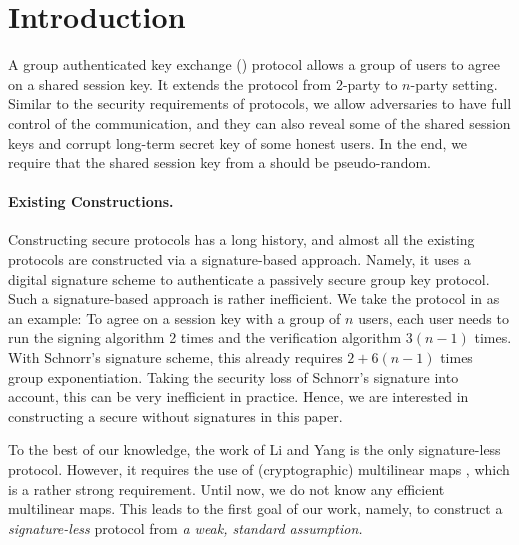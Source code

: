 \newcommand{\introGAKE}{\text{GAKE}\xspace}
\newcommand{\introAKE}{\text{AKE}\xspace}
\newcommand{\introNumSess}{s}
\newcommand{\introNumUser}{n}


\section{Introduction}\label{sec:introduction}
A group authenticated key exchange (\introGAKE) protocol allows a group of users to agree on a shared session key. It extends the \introAKE protocol from 2-party to $n$-party setting. Similar to the security requirements of \introAKE protocols, we allow adversaries to have full control of the communication, and they can also reveal some of the shared session keys and corrupt long-term secret key of some honest users. 
In the end, we require that the shared session key from a \introGAKE should be pseudo-random.

\paragraph{Existing Constructions.}
Constructing secure \introGAKE protocols has a long history, and almost all the existing protocols \cite{CCS:BCPQ01,AC:BreChePoi01,EC:BreChePoi02,PQCRYPTO:ADGK19,JC:PanQiaRin22} are constructed via a signature-based approach. Namely, it uses a digital signature scheme to authenticate a passively secure group key protocol. Such a signature-based approach is rather inefficient. We take the protocol in \cite{JC:PanQiaRin22} as an example: To agree on a session key with a group of $n$ users, each user needs to run the signing algorithm 2 times and the verification algorithm $3(n-1)$ times. With Schnorr's signature scheme, this already requires $2+6(n-1)$ times group exponentiation. Taking the security loss of Schnorr's signature into account, this can be very inefficient in practice. Hence, we are interested in constructing a secure \introGAKE without signatures in this paper.

To the best of our knowledge, the work of Li and Yang \cite{CANS:LiYan13} is the only signature-less \introGAKE protocol. However, it requires the use of (cryptographic) multilinear maps \cite{EC:GarGenHal13}, which is a rather strong requirement. Until now, we do not know any efficient multilinear maps. This leads to the first goal of our work, namely, to construct a \textit{signature-less} \introGAKE protocol from \textit{a weak, standard assumption.}


